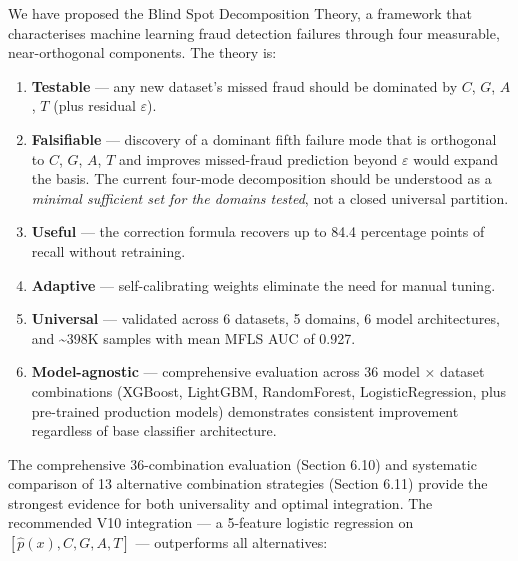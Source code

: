 \documentclass[
  11pt,
]{article}
\providecommand{\tightlist}{%
  \setlength{\itemsep}{0pt}\setlength{\parskip}{0pt}}
\begin{document}
We have proposed the Blind Spot Decomposition Theory, a framework that
characterises machine learning fraud detection failures through four
measurable, near-orthogonal components. The theory is:

\begin{enumerate}
\def\labelenumi{\arabic{enumi}.}
\tightlist
\item
  \textbf{Testable} — any new dataset’s missed fraud should be dominated
  by \(C\), \(G\), \(A\), \(T\) (plus residual \(\varepsilon\)).
\item
  \textbf{Falsifiable} — discovery of a dominant fifth failure mode that
  is orthogonal to \(C\), \(G\), \(A\), \(T\) and improves missed-fraud
  prediction beyond \(\varepsilon\) would expand the basis. The current
  four-mode decomposition should be understood as a \emph{minimal
  sufficient set for the domains tested}, not a closed universal
  partition.
\item
  \textbf{Useful} — the correction formula recovers up to 84.4
  percentage points of recall without retraining.
\item
  \textbf{Adaptive} — self-calibrating weights eliminate the need for
  manual tuning.
\item
  \textbf{Universal} — validated across 6 datasets, 5 domains, 6 model
  architectures, and \textasciitilde398K samples with mean MFLS AUC of
  0.927.
\item
  \textbf{Model-agnostic} — comprehensive evaluation across 36 model ×
  dataset combinations (XGBoost, LightGBM, RandomForest,
  LogisticRegression, plus pre-trained production models) demonstrates
  consistent improvement regardless of base classifier architecture.
\end{enumerate}

The comprehensive 36-combination evaluation (Section 6.10) and
systematic comparison of 13 alternative combination strategies (Section
6.11) provide the strongest evidence for both universality and optimal
integration. The recommended V10 integration — a 5-feature logistic
regression on \([\hat{p}(x), C, G, A, T]\) — outperforms all
alternatives:
\end{document}
